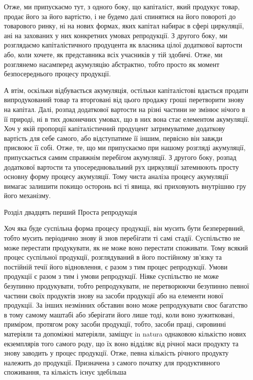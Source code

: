 Отже, ми припускаємо тут, з одного боку, що капіталіст,
який продукує товар, продає його за його вартістю, і не будемо
далі спинятися на його повороті до товарового ринку, ні на
нових формах, яких капітал набирає в сфері циркуляції, ані на
захованих у них конкретних умовах репродукції. З другого боку,
ми розглядаємо капіталістичного продуцента як власника цілої
додаткової вартости або, коли хочете, як представника всіх учасників
у тій здобичі. Отже, ми розглянемо насамперед акумуляцію
абстрактно, тобто просто як момент безпосереднього процесу
продукції.

А втім, оскільки відбувається акумуляція, остільки капіталістові
вдається продати випродукований товар та вторговані
від цього продажу гроші перетворити знову на капітал. Далі,
розпад додаткової вартости на різні частини не змінює нічого в
її природі, ні в тих доконечних умовах, що в них вона стає елементом
акумуляції. Хоч у якій пропорції капіталістичний продуцент
затримуватиме додаткову вартість для себе самого, або
відступатиме її іншим, первісно він завжди присвоює її собі.
Отже, те, що ми припускаємо при нашому розгляді акумуляції,
припускається самим справжнім перебігом акумуляції. З другого
боку, розпад додаткової вартости та упосереднювальний рух циркуляції
затемнюють просту основну форму процесу акумуляції.
Тому чиста аналіза процесу акумуляції вимагає залишити покищо
осторонь всі ті явища, які приховують внутрішню гру його
механізму.

Розділ двадцять перший
Проста репродукція

Хоч яка буде суспільна форма процесу продукції, він мусить
бути безперервний, тобто мусить періодично знову й знов перебігати
ті самі стадії. Суспільство не може перестати продукувати,
як не може воно перестати споживати. Тому всякий процес
суспільної продукції, розглядуваний в його постійному зв’язку
та постійній течії його відновлення, є разом з тим процес репродукції.
Умови продукції є разом з тим і умови репродукції. Ніяке
суспільство не може безупинно продукувати, тобто репродукувати,
не перетворюючи безупинно певної частини своїх продуктів
знову на засоби продукції або на елементи нової продукції.
За інших незмінних обставин воно може репродукувати своє багатство
в тому самому маштабі або зберігати його лише тоді, коли
воно зужитковані, приміром, протягом року засоби продукції,
тобто, засоби праці, сировинні матеріяли та допоміжні матеріяли,
заміщує in natura однаковою кількістю нових екземплярів того
самого роду, що їх воно відділяє від річної маси продукту та
знову заводить у процес продукції. Отже, певна кількість річного
продукту належить до продукції. Призначена з самого початку
для продуктивного споживання, та кількість існує здебільша
